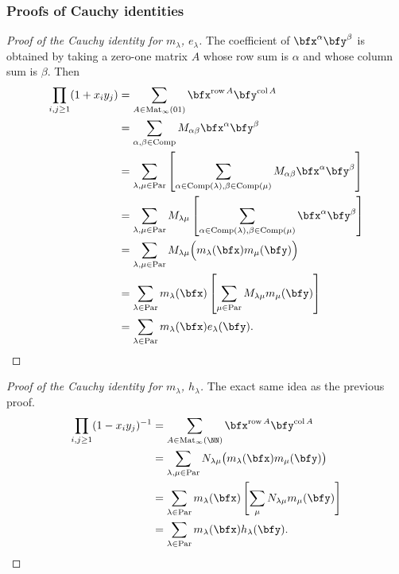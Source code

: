 \documentclass{article}
\DeclareMathOperator{\row}{row}
\DeclareMathOperator{\col}{col}
\DeclareMathOperator{\Par}{Par}
\DeclareMathOperator{\Com}{Comp}
\DeclareMathOperator{\Mat}{Mat}
\begin{document}
\subsubsection{Proofs of Cauchy identities}

\begin{proof}
    [Proof of the Cauchy identity for $m_\lambda$, $e_\lambda$]
    The coefficient of $\bfx^\alpha \bfy^\beta$ is obtained by taking a zero-one matrix $A$ whose row sum is $\alpha$ and whose column sum is $\beta$. Then
    \begin{align*}
        \prod_{i,j\geq1}(1+x_iy_j)
        &=
        \sum_{A \in \Mat_\infty(01)}
        \bfx^{\row A}\bfy^{\col A} \\
        &=
        \sum_{\alpha,\beta \in \Com}
        M_{\alpha\beta}\bfx^\alpha \bfy^\beta \\
        &=
        \sum_{\lambda,\mu\in\Par}
        \left[
            \sum_{\alpha \in \Com(\lambda), \beta \in \Com(\mu)}
            M_{\alpha\beta} \bfx^\alpha \bfy^\beta
        \right] \\
        &=
        \sum_{\lambda,\mu\in\Par}
        M_{\lambda\mu}
        \left[
            \sum_{\alpha \in \Com(\lambda), \beta \in \Com(\mu)}
            \bfx^\alpha \bfy^\beta
        \right] \\
        &=
        \sum_{\lambda,\mu \in \Par}
        M_{\lambda\mu}
        \Big(
            m_\lambda(\bfx) m_\mu(\bfy)
        \Big) \\
        &=
        \sum_{\lambda \in \Par}
        m_\lambda(\bfx)
        \left[
            \sum_{\mu\in\Par}
            M_{\lambda\mu} m_\mu(\bfy)
        \right] \\
        &=
        \sum_{\lambda \in \Par}
        m_\lambda(\bfx) e_\lambda(\bfy).
    \end{align*}
\end{proof}

\begin{proof}
    [Proof of the Cauchy identity for $m_\lambda$, $h_\lambda$]
    The exact same idea as the previous proof.
    \begin{align*}
        \prod_{i,j\geq1}(1-x_iy_j)^{-1} 
        &= 
        \sum_{A \in \Mat_\infty(\NN)}
        \bfx^{\row A}\bfy^{\col A} 
        \\
        &= 
        \sum_{\lambda,\mu\in\Par} N_{\lambda\mu} 
        \big(m_\lambda(\bfx) m_\mu(\bfy)\big) 
        \\
        &= 
        \sum_{\lambda\in\Par} 
        m_\lambda(\bfx) 
        \left[
            \sum_\mu N_{\lambda\mu} m_\mu(\bfy)
        \right]
        \\
        &= 
        \sum_{\lambda\in\Par} 
        m_\lambda(\bfx) h_\lambda(\bfy).
    \end{align*}
\end{proof}
\end{document}

